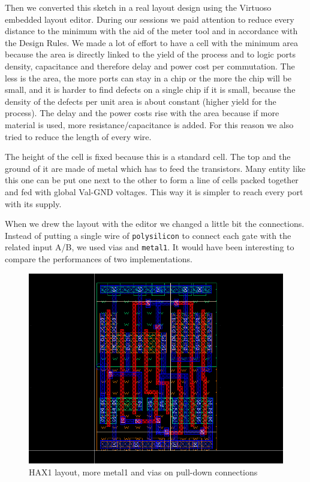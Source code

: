 \documentclass[a4paper]{article}
\begin{document}
Then we converted this sketch in a real layout design using the Virtuoso embedded layout editor. During our sessions we paid attention to reduce every distance to the minimum with the aid of the meter tool and in accordance with the Design Rules. We made a lot of effort to have a cell with the minimum area because the area is directly linked to the yield of the process and to logic ports density, capacitance and therefore delay and power cost per commutation. The less is the area, the more ports can stay in a chip or the more the chip will be small, and it is harder to find defects on a single chip if it is small, because the density of the defects per unit area is about constant (higher yield for the process). The delay and the power costs rise with the area because if more material is used, more resistance/capacitance is added. For this reason we also tried to reduce the length of every wire.

The height of the cell is fixed because this is a standard cell. The top and the ground of it are made of metal which has to feed the transistors. Many entity like this one can be put one next to the other to form a line of cells packed together and fed with global Val-GND voltages. This way it is simpler to reach every port with its supply.

When we drew the layout with the editor we changed a little bit the connections. Instead of putting a single wire of \texttt{polysilicon} to connect each gate with the related input A/B, we used vias and \texttt{metal1}. It would have been interesting to compare the performances of two implementations.

\begin{figure}[H]
      \centering
       \includegraphics[width=12cm]{./Images/HA/HAX1_poly-metal_layout.png}
\caption{HAX1 layout, more metal1 and vias on pull-down connections}
\label{fig: HAX1_lay_drw}
\end{figure}
\end{document}
